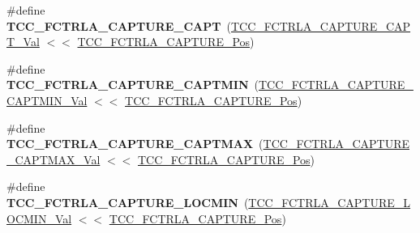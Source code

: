 \begin{DoxyCompactItemize}
\item 
\hypertarget{group___s_a_m_l21___t_c_c_gaa4d693b9b0e47882931fc7b90a25b5c8}{}\#define {\bfseries T\+C\+C\+\_\+\+F\+C\+T\+R\+L\+A\+\_\+\+C\+A\+P\+T\+U\+R\+E\+\_\+\+C\+A\+P\+T}~(\hyperlink{group___s_a_m_l21___t_c_c_gae9ce0184c28ab59a89bcdd379cf3b7a6}{T\+C\+C\+\_\+\+F\+C\+T\+R\+L\+A\+\_\+\+C\+A\+P\+T\+U\+R\+E\+\_\+\+C\+A\+P\+T\+\_\+\+Val}   $<$$<$ \hyperlink{group___s_a_m_l21___t_c_c_ga130a647ff472e004168fd7ec22f13b9d}{T\+C\+C\+\_\+\+F\+C\+T\+R\+L\+A\+\_\+\+C\+A\+P\+T\+U\+R\+E\+\_\+\+Pos})\label{group___s_a_m_l21___t_c_c_gaa4d693b9b0e47882931fc7b90a25b5c8}

\item 
\hypertarget{group___s_a_m_l21___t_c_c_gaaeab2d7263df296ec66f1c8488065314}{}\#define {\bfseries T\+C\+C\+\_\+\+F\+C\+T\+R\+L\+A\+\_\+\+C\+A\+P\+T\+U\+R\+E\+\_\+\+C\+A\+P\+T\+M\+I\+N}~(\hyperlink{group___s_a_m_l21___t_c_c_ga43bccd1a8e1e39804161e2047b5b5784}{T\+C\+C\+\_\+\+F\+C\+T\+R\+L\+A\+\_\+\+C\+A\+P\+T\+U\+R\+E\+\_\+\+C\+A\+P\+T\+M\+I\+N\+\_\+\+Val} $<$$<$ \hyperlink{group___s_a_m_l21___t_c_c_ga130a647ff472e004168fd7ec22f13b9d}{T\+C\+C\+\_\+\+F\+C\+T\+R\+L\+A\+\_\+\+C\+A\+P\+T\+U\+R\+E\+\_\+\+Pos})\label{group___s_a_m_l21___t_c_c_gaaeab2d7263df296ec66f1c8488065314}

\item 
\hypertarget{group___s_a_m_l21___t_c_c_ga4d3e8d4ac8055b5113c137a34987cba5}{}\#define {\bfseries T\+C\+C\+\_\+\+F\+C\+T\+R\+L\+A\+\_\+\+C\+A\+P\+T\+U\+R\+E\+\_\+\+C\+A\+P\+T\+M\+A\+X}~(\hyperlink{group___s_a_m_l21___t_c_c_ga2e9b52ae43bcd0bc50ecb8176ac4a9e7}{T\+C\+C\+\_\+\+F\+C\+T\+R\+L\+A\+\_\+\+C\+A\+P\+T\+U\+R\+E\+\_\+\+C\+A\+P\+T\+M\+A\+X\+\_\+\+Val} $<$$<$ \hyperlink{group___s_a_m_l21___t_c_c_ga130a647ff472e004168fd7ec22f13b9d}{T\+C\+C\+\_\+\+F\+C\+T\+R\+L\+A\+\_\+\+C\+A\+P\+T\+U\+R\+E\+\_\+\+Pos})\label{group___s_a_m_l21___t_c_c_ga4d3e8d4ac8055b5113c137a34987cba5}

\item 
\hypertarget{group___s_a_m_l21___t_c_c_ga5812d39a917810e2b0ee4d0dad6380d1}{}\#define {\bfseries T\+C\+C\+\_\+\+F\+C\+T\+R\+L\+A\+\_\+\+C\+A\+P\+T\+U\+R\+E\+\_\+\+L\+O\+C\+M\+I\+N}~(\hyperlink{group___s_a_m_l21___t_c_c_ga7986fbe253b4d48fb4843d36dcea0102}{T\+C\+C\+\_\+\+F\+C\+T\+R\+L\+A\+\_\+\+C\+A\+P\+T\+U\+R\+E\+\_\+\+L\+O\+C\+M\+I\+N\+\_\+\+Val} $<$$<$ \hyperlink{group___s_a_m_l21___t_c_c_ga130a647ff472e004168fd7ec22f13b9d}{T\+C\+C\+\_\+\+F\+C\+T\+R\+L\+A\+\_\+\+C\+A\+P\+T\+U\+R\+E\+\_\+\+Pos})\label{group___s_a_m_l21___t_c_c_ga5812d39a917810e2b0ee4d0dad6380d1}


\end{DoxyCompactItemize}
